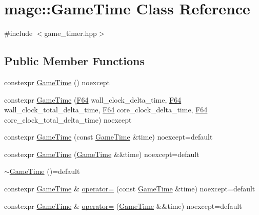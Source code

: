 \hypertarget{classmage_1_1_game_time}{}\section{mage\+:\+:Game\+Time Class Reference}
\label{classmage_1_1_game_time}


{\ttfamily \#include $<$game\+\_\+timer.\+hpp$>$}

\subsection*{Public Member Functions}
\begin{DoxyCompactItemize}
\item 
constexpr \hyperlink{classmage_1_1_game_time_af39a4fbd42467249874ba9372f463552}{Game\+Time} () noexcept
\item 
constexpr \hyperlink{classmage_1_1_game_time_aaee30f360c0ae8383a16f908fe3abe78}{Game\+Time} (\hyperlink{namespacemage_ad26233bbec640deda836e572c1a23708}{F64} wall\+\_\+clock\+\_\+delta\+\_\+time, \hyperlink{namespacemage_ad26233bbec640deda836e572c1a23708}{F64} wall\+\_\+clock\+\_\+total\+\_\+delta\+\_\+time, \hyperlink{namespacemage_ad26233bbec640deda836e572c1a23708}{F64} core\+\_\+clock\+\_\+delta\+\_\+time, \hyperlink{namespacemage_ad26233bbec640deda836e572c1a23708}{F64} core\+\_\+clock\+\_\+total\+\_\+delta\+\_\+time) noexcept
\item 
constexpr \hyperlink{classmage_1_1_game_time_a7af065c229b72b1daa5a8f6cc6553ede}{Game\+Time} (const \hyperlink{classmage_1_1_game_time}{Game\+Time} \&time) noexcept=default
\item 
constexpr \hyperlink{classmage_1_1_game_time_a87dd026fe0c83aee86c39e4c40e641fb}{Game\+Time} (\hyperlink{classmage_1_1_game_time}{Game\+Time} \&\&time) noexcept=default
\item 
\hyperlink{classmage_1_1_game_time_ae7a709bde27a737be9ebed2a92e00c8b}{$\sim$\+Game\+Time} ()=default
\item 
constexpr \hyperlink{classmage_1_1_game_time}{Game\+Time} \& \hyperlink{classmage_1_1_game_time_a7ebc520cb69228e457c24958e7b97baa}{operator=} (const \hyperlink{classmage_1_1_game_time}{Game\+Time} \&time) noexcept=default
\item 
constexpr \hyperlink{classmage_1_1_game_time}{Game\+Time} \& \hyperlink{classmage_1_1_game_time_a79756019f21b5125114483ddc71247fe}{operator=} (\hyperlink{classmage_1_1_game_time}{Game\+Time} \&\&time) noexcept=default
\item 

\end{DoxyCompactItemize}
